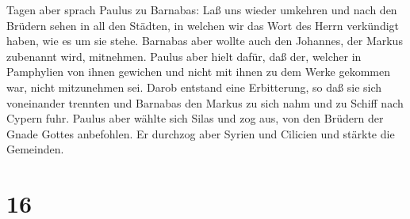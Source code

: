 Tagen aber sprach Paulus zu Barnabas: Laß uns wieder umkehren und nach
den Brüdern sehen in all den Städten, in welchen wir das Wort des Herrn
verkündigt haben, wie es um sie stehe.  Barnabas aber
wollte auch den Johannes, der Markus zubenannt wird, mitnehmen.
 Paulus aber hielt dafür, daß der, welcher in Pamphylien
von ihnen gewichen und nicht mit ihnen zu dem Werke gekommen war, nicht
mitzunehmen sei.  Darob entstand eine Erbitterung, so daß
sie sich voneinander trennten und Barnabas den Markus zu sich nahm und
zu Schiff nach Cypern fuhr.  Paulus aber wählte sich
Silas und zog aus, von den Brüdern der Gnade Gottes anbefohlen.
 Er durchzog aber Syrien und Cilicien und stärkte die
Gemeinden.

\hypertarget{section-15}{%
\section{16}\label{section-15}}

